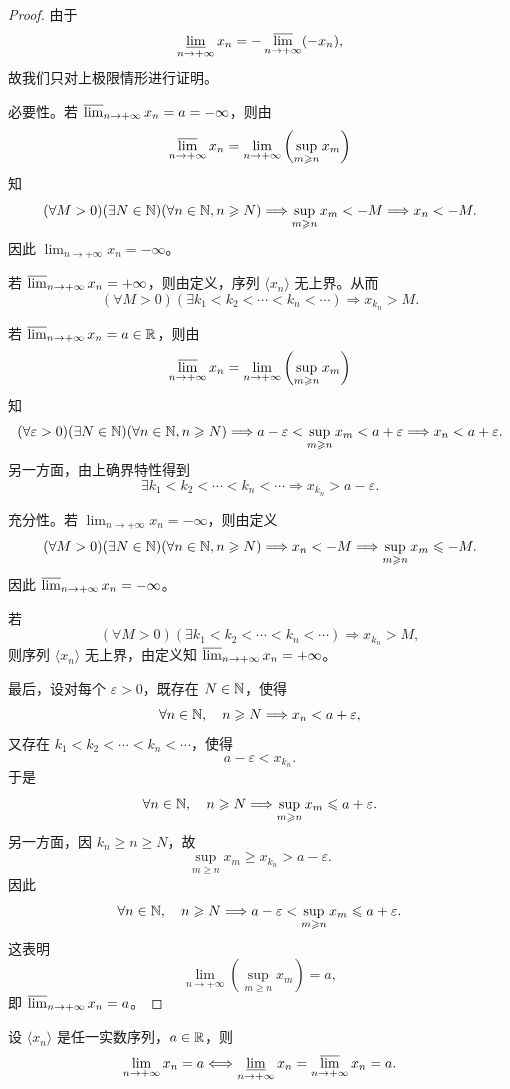 \begin{proof}
由于
\[
\varliminf_{n\to+\infty}x_n
=-\varlimsup_{n\to+\infty}(-x_n),
\]
故我们只对上极限情形进行证明。

必要性。若
\(\varlimsup_{n\to+\infty}x_n=a=-\infty\)，则由
\[
\varlimsup_{n\to+\infty}x_n
=\lim_{n\to+\infty}\left(\sup_{m\geqslant n}x_m\right)
\]
知
\[
(\forall M>0)(\exists N\in\mathbb{N})(\forall n\in\mathbb{N}, n\geqslant N)
\Longrightarrow \sup_{m\geqslant n}x_m<-M
\Longrightarrow x_n<-M.
\]
因此 \(\lim_{n\to+\infty}x_n=-\infty\)。

若 \(\varlimsup_{n\to+\infty}x_n=+\infty\)，则由定义，序列
\(\langle x_n\rangle\) 无上界。从而
\[
(\forall M>0)(\exists k_1<k_2<\cdots<k_n<\cdots)
\Longrightarrow x_{k_n}>M.
\]

若 \(\varlimsup_{n\to+\infty}x_n=a\in\mathbb{R}\)，则由
\[
\varlimsup_{n\to+\infty}x_n
=\lim_{n\to+\infty}\left(\sup_{m\geqslant n}x_m\right)
\]
知
\[
(\forall\varepsilon>0)(\exists N\in\mathbb{N})(\forall n\in\mathbb{N}, n\geqslant N)
\Longrightarrow
a-\varepsilon<\sup_{m\geqslant n}x_m<a+\varepsilon
\Longrightarrow x_n<a+\varepsilon.
\]
另一方面，由上确界特性得到
\[
\exists k_1<k_2<\cdots<k_n<\cdots
\Longrightarrow x_{k_n}>a-\varepsilon.
\]

充分性。若 \(\lim_{n\to+\infty}x_n=-\infty\)，则由定义
\[
(\forall M>0)(\exists N\in\mathbb{N})(\forall n\in\mathbb{N}, n\geqslant N)
\Longrightarrow x_n<-M
\Longrightarrow \sup_{m\geqslant n}x_m\leqslant-M.
\]
因此 \(\varlimsup_{n\to+\infty}x_n=-\infty\)。

若
\[
(\forall M>0)(\exists k_1<k_2<\cdots<k_n<\cdots)
\Longrightarrow x_{k_n}>M,
\]
则序列 \(\langle x_n\rangle\) 无上界，由定义知
\(\varlimsup_{n\to+\infty}x_n=+\infty\)。

最后，设对每个 \(\varepsilon>0\)，既存在 \(N\in\mathbb{N}\)，使得
\[
\forall n\in\mathbb{N},\quad n\geqslant N\Longrightarrow x_n<a+\varepsilon,
\]
又存在 \(k_1<k_2<\cdots<k_n<\cdots\)，使得
\[
a-\varepsilon<x_{k_n}.
\]
于是
\[
\forall n\in\mathbb{N},\quad n\geqslant N
\Longrightarrow \sup_{m\geqslant n}x_m\leqslant a+\varepsilon.
\]
另一方面，因 \(k_n\geqslant n\geqslant N\)，故
\[
\sup_{m\geqslant n}x_m\geqslant x_{k_n}>a-\varepsilon.
\]
因此
\[
\forall n\in\mathbb{N},\quad n\geqslant N
\Longrightarrow
a-\varepsilon<\sup_{m\geqslant n}x_m\leqslant a+\varepsilon.
\]
这表明
\[
\lim_{n\to+\infty}\left(\sup_{m\geqslant n}x_m\right)=a,
\]
即 \(\varlimsup_{n\to+\infty}x_n=a\)。
\end{proof}

\begin{mycor*}{}
设 \(\langle x_n\rangle\) 是任一实数序列，\(a\in\mathbb{R}\)，则
\[
\lim_{n\to+\infty}x_n=a
\Longleftrightarrow
\varliminf_{n\to+\infty}x_n
=\varlimsup_{n\to+\infty}x_n=a.
\]
\end{mycor*}

